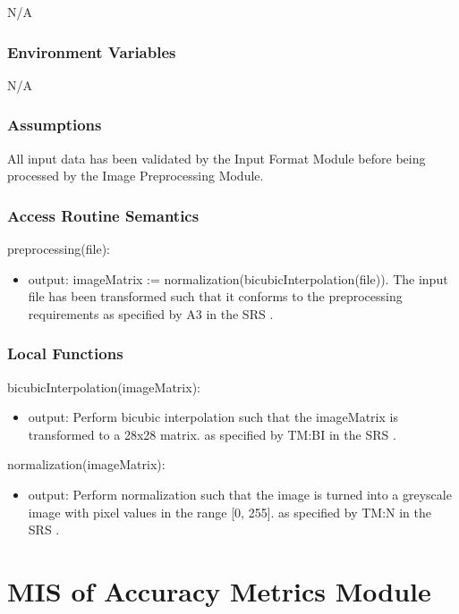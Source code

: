\documentclass[12pt, titlepage]{article}
\begin{document}
\begin{itemize}
N/A

\subsubsection{Environment Variables}

N/A

\subsubsection{Assumptions}

All input data has been validated by the Input Format Module before being
processed by the Image Preprocessing Module.

\subsubsection{Access Routine Semantics}

\noindent preprocessing(file):
\begin{itemize} 
\item output: imageMatrix := normalization(bicubicInterpolation(file)). The
input file has been transformed such that it conforms to the preprocessing
requirements as specified by A3 in the SRS \cite[4.2.1]{SRS}.
\end{itemize}

\subsubsection{Local Functions}

\noindent bicubicInterpolation(imageMatrix):
\begin{itemize}
\item output: Perform bicubic interpolation such that the imageMatrix is
transformed to a 28x28 matrix. as specified by TM:BI in the SRS \cite[4.2.2]{SRS}.
\end{itemize}
\noindent normalization(imageMatrix):
\begin{itemize}
\item output: Perform normalization such that the image is turned into a
greyscale image with pixel values in the range [0, 255]. as specified by TM:N in
the SRS \cite[4.2.2]{SRS}.
\end{itemize}

\section{MIS of Accuracy Metrics Module} \label{mAccuracy}


\end{itemize}
\end{document}
